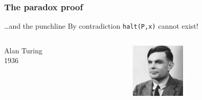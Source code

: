 \documentclass[handout, 12pt]{beamer}
\begin{document}
\begin{frame}

\frametitle{The paradox proof}

\begin{block}{\ldots and the punchline}
\centering
\vspace{1.5em}
{\large By contradiction \texttt{halt(P,x)} cannot exist!}
\end{block}

\begin{block}{}
\centering
\color{r}{\large QED}
\end{block}

\pause

\begin{block}{}
\begin{columns}[c] 
\begin{column}{0.5\textwidth}
\raggedleft
Alan Turing\\
1936
\end{column}
\begin{column}{0.6\textwidth}
\raggedright
\includegraphics[width=7em]{pics/alan_turing.jpg}
\end{column}
\end{columns}
\end{block}

\end{frame}
\end{document}
